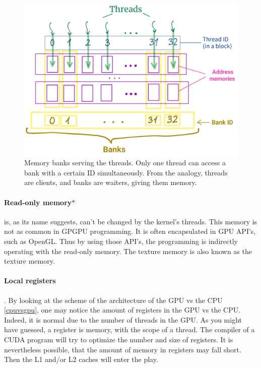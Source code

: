 \documentclass[12pt]{article}
\begin{document}
\begin{figure}[H]
   \centering
   \includegraphics[scale=0.18]{pngs/banks1.png}
   \caption{Memory banks serving the threads. Only one thread can access a bank with a certain ID simultaneously. 
   From the analogy, threads are clients, and banks are waiters, giving them memory.}
   \label{banks}

\end{figure}

\vspace{-0.5cm}
\paragraph{Read-only memory$\ast$} is, as its name suggests, can't be changed by the kernel's threads. This memory is not as common 
in GPGPU programming. It is often encapsulated in GPU API's, such as OpenGL. Thus by using those API's, the programming is indirectly 
operating with the read-only memory. The texture memory is also known as the texture memory.

\paragraph{Local registers}. By looking at the scheme of the architecture of the GPU vs the CPU \autoref{cpuvsgpu}, one may notice the amount 
of registers in the GPU vs the CPU. Indeed, it is normal due to the number of threads in the GPU. As you might have guessed, a 
register is memory, with the scope of a thread. The compiler of a CUDA program will try to optimize the number and size of registers. 
It is nevertheless possible, that the amount of memory in registers may fall short. Then the L1 and/or L2 caches will enter the 
play.
\end{document}
